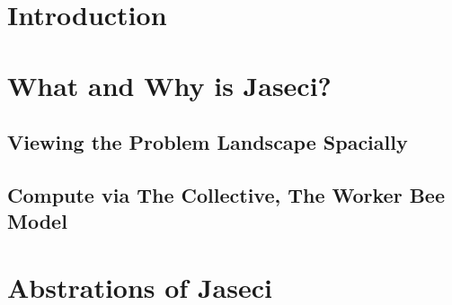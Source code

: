 \documentclass{book}
\begin{document}
\chapter{Introduction}


\chapter{What and Why is Jaseci?}
\section{Viewing the Problem Landscape Spacially}
\section{Compute via The Collective, The Worker Bee Model}

\chapter{Abstrations of Jaseci}
\end{document}
